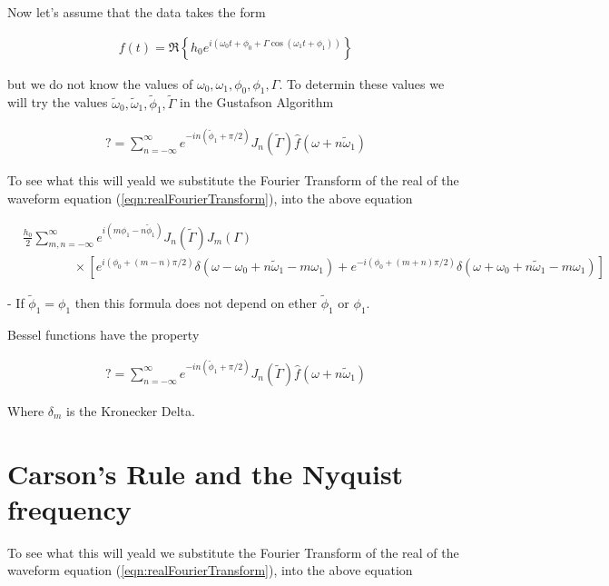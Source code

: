 \documentclass[onecolumn, groupedaddress, 10pt]{revtex4-1}
\begin{document}
Now let's assume that the data takes the form 

\begin{align}
\label{eqn:realData}
f(t) = \Re \left\{ h_0 e^{i\left( \omega_0 t + \phi_0 + \Gamma \cos( \omega_1 t + \phi_1 ) \right)} \right\}
\end{align}

but we do not know the values of $\omega_0, \omega_1, \phi_0, \phi_1, \Gamma$.  To determin these values we will try the values $\widetilde{\omega}_0, \widetilde{\omega}_1, \widetilde{\phi}_1, \widetilde{\Gamma}$ in the Gustafson Algorithm

\begin{align}
? = \sum_{n=-\infty}^{\infty} e^{-in(\widetilde{\phi}_1+\pi/2)} J_n(\widetilde{\Gamma}) \hat{f} (\omega + n\widetilde{\omega}_1)
\end{align}

To see what this will yeald we substitute the Fourier Transform of the real of the waveform equation (\ref{eqn:realFourierTransform}), into the above equation

\begin{align}
&\frac{h_0}{2} \sum_{m,n=-\infty}^{\infty} e^{i(m\phi_1-n\widetilde{\phi}_1)} J_n(\widetilde{\Gamma}) J_m (\Gamma)				\nonumber \\
&\qquad \qquad
\times \left[
e^{i(\phi_0 + (m-n)\pi/2)} \delta(\omega - \omega_0 + n\widetilde{\omega}_1 - m\omega_1)
+ e^{-i(\phi_0 + (m+n)\pi/2)} \delta(\omega + \omega_0 + n\widetilde{\omega}_1 - m\omega_1)
\right]
\end{align}

- If $\widetilde{\phi}_1 = \phi_1$ then this formula does not depend on ether $\widetilde{\phi}_1$ or $\phi_1$.



Bessel functions have the property \cite{}

\begin{align}
? = \sum_{n=-\infty}^{\infty} e^{-in(\widetilde{\phi}_1+\pi/2)} J_n(\widetilde{\Gamma}) \hat{f} (\omega + n\widetilde{\omega}_1)
\end{align}

Where $\delta_{m}$ is the Kronecker Delta.  \cite{}  


\section{Carson's Rule and the Nyquist frequency}
To see what this will yeald we substitute the Fourier Transform of the real of the waveform equation (\ref{eqn:realFourierTransform}), into the above equation
\end{document}
